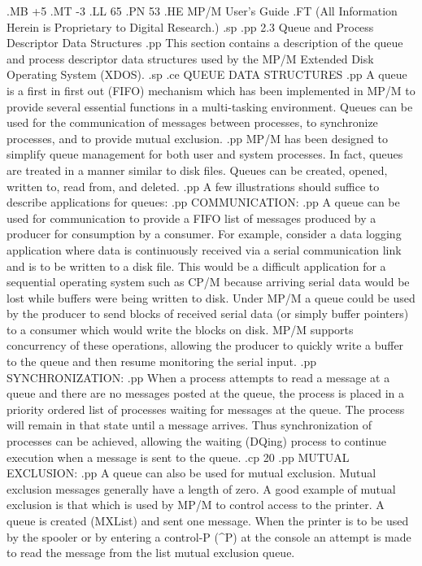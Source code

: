 .MB +5
.MT -3
.LL 65
.PN 53
.HE MP/M User's Guide
.FT   (All Information Herein is Proprietary to Digital Research.)
.sp
.pp
2.3  Queue and Process Descriptor Data Structures
.pp
This section contains a description of the queue and process
descriptor data structures used by the MP/M Extended Disk Operating
System (XDOS).
.sp
.ce
QUEUE DATA STRUCTURES
.pp
A queue is a first in first out (FIFO) mechanism which has been
implemented in MP/M to provide several essential functions in a
multi-tasking environment.  Queues can be used for the communication
of messages between processes, to synchronize processes, and to provide
mutual exclusion.
.pp
MP/M has been designed to simplify queue management for both user
and system processes.  In fact, queues are treated in a manner
similar to disk files.  Queues can be created, opened, written to,
read from, and deleted.
.pp
A few illustrations should suffice to describe applications
for queues:
.pp
COMMUNICATION:
.pp
A queue can be used for communication to provide a FIFO list of
messages produced by a producer for consumption by a consumer.
For example, consider a data logging application where
data is continuously received via a serial communication link and is to
be written to a disk file.  This would be a difficult application
for a sequential operating system such as CP/M because arriving
serial data would be lost while buffers were being written to
disk.  Under MP/M a queue could be used by the producer to send
blocks of received serial data (or simply buffer pointers) to a consumer
which would write the blocks on disk.  MP/M supports concurrency of
these operations, allowing the producer to quickly write a buffer to
the queue and then resume monitoring the serial input.
.pp
SYNCHRONIZATION:
.pp
When a process attempts to read a message at a queue and there are
no messages posted at the queue, the process is placed in a priority
ordered list of processes waiting for messages at the queue.  The
process will remain in that state until a message arrives.  Thus
synchronization of processes can be achieved, allowing the waiting
(DQing) process to continue execution when a message is sent to
the queue.
.cp 20
.pp
MUTUAL EXCLUSION:
.pp
A queue can also be used for mutual exclusion.
Mutual exclusion messages generally have a length of zero.  A good
example of mutual exclusion is that which is used by MP/M to
control access to the printer.  A queue is created (MXList)
and sent one message.  When the printer is to be used by the spooler
or by entering a control-P (^P) at the console an attempt is
made to read the message from the list mutual exclusion queue.
